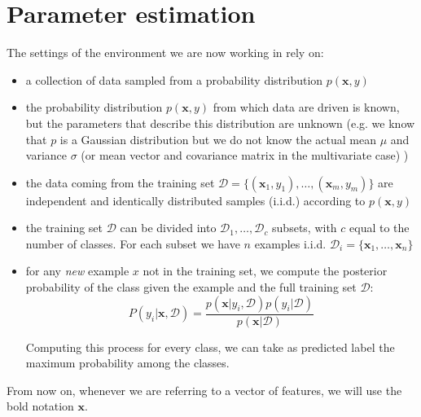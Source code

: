 \chapter{Parameter estimation}

\label{cha:param_estimation}

The settings of the environment we are now working in rely on:
\begin{itemize}
    \item a collection of data sampled from a probability distribution $p(\pmb{x}, y)$
    \item the probability distribution $p(\pmb{x}, y)$ from which data are driven is known, but the parameters that describe this distribution are unknown (e.g. we know that $p$ is a Gaussian distribution but we do not know the actual mean $\mu$ and variance $\sigma$ (or mean vector and covariance matrix in the multivariate case) )
    \item the data coming from the training set $\mathcal{D} = \{(\pmb{x}_1, y_1), \dots, (\pmb{x}_m, y_m)\}$ are independent and identically distributed samples (i.i.d.) according to $p(\pmb{x}, y)$
    \item the training set $\mathcal{D}$ can be divided into $\mathcal{D}_1, \dots, \mathcal{D}_c$ subsets, with $c$ equal to the number of classes. For each subset we have $n$ examples i.i.d. $\mathcal{D}_i = \{\pmb{x}_1, \dots, \pmb{x}_n\}$
    \item for any \textit{new} example $x$ not in the training set, we compute the posterior probability of the class given the example and the full training set
    $\mathcal{D}$:
    \begin{equation}
    P(y_i|\pmb{x}, \mathcal{D}) = \frac{p(\pmb{x}|y_i, \mathcal{D})p(y_i|\mathcal{D})}{p(\pmb{x}|\mathcal{D})}
    \label{eq:main_eq}
    \end{equation}
    
    Computing this process for every class, we can take as predicted label the maximum probability among the classes.
\end{itemize}


From now on, whenever we are referring to a vector of features, we will use the bold notation $\pmb{x}$.


